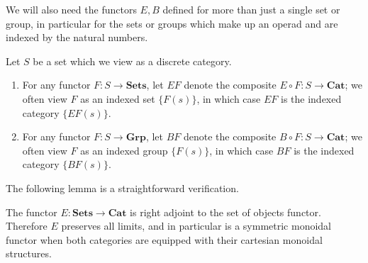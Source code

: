 \documentclass{amsbook} %
\newcommand{\mb}{\mathbf}
\numberwithin{section}{chapter}
\begin{document}
We will also need the functors $E, B$ defined for more than just a single set or group, in particular for the sets or groups which make up an operad and are indexed by the natural numbers.

\begin{nota}\label{nota:e_b}
Let $S$ be a set which we view as a discrete category.
\begin{enumerate}
\item For any functor $F:S \rightarrow \mb{Sets}$, let $EF$ denote the composite $E \circ F:S \rightarrow \mb{Cat}$; we often view $F$ as an indexed set $\{ F(s) \}$, in which case $EF$ is the indexed category $\{ EF(s) \}$.
\item For any functor $F:S \rightarrow \mb{Grp}$, let $BF$ denote the composite $B \circ F:S \rightarrow \mb{Cat}$; we often view $F$ as an indexed group $\{ F(s) \}$, in which case $BF$ is the indexed category $\{ BF(s) \}$.
\end{enumerate}
\end{nota}

The following lemma is a straightforward verification.

\begin{lem}\label{symmoncor}
The functor $E:\mb{Sets} \rightarrow \mb{Cat}$ is right adjoint to the set of objects functor.  Therefore $E$ preserves all limits, and in particular is a symmetric monoidal functor when both categories are equipped with their cartesian monoidal structures.
\end{lem}

\end{document}
